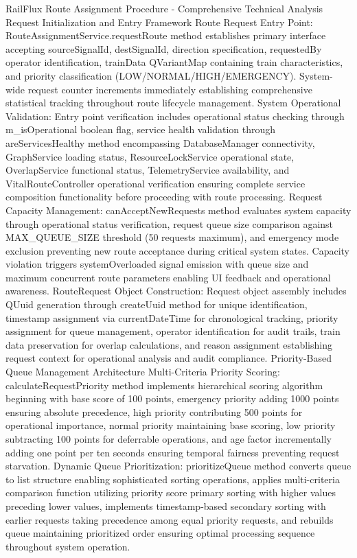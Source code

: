 RailFlux Route Assignment Procedure - Comprehensive Technical Analysis
Request Initialization and Entry Framework
Route Request Entry Point: RouteAssignmentService.requestRoute method establishes primary interface accepting sourceSignalId, destSignalId, direction specification, requestedBy operator identification, trainData QVariantMap containing train characteristics, and priority classification (LOW/NORMAL/HIGH/EMERGENCY). System-wide request counter increments immediately establishing comprehensive statistical tracking throughout route lifecycle management.
System Operational Validation: Entry point verification includes operational status checking through m_isOperational boolean flag, service health validation through areServicesHealthy method encompassing DatabaseManager connectivity, GraphService loading status, ResourceLockService operational state, OverlapService functional status, TelemetryService availability, and VitalRouteController operational verification ensuring complete service composition functionality before proceeding with route processing.
Request Capacity Management: canAcceptNewRequests method evaluates system capacity through operational status verification, request queue size comparison against MAX_QUEUE_SIZE threshold (50 requests maximum), and emergency mode exclusion preventing new route acceptance during critical system states. Capacity violation triggers systemOverloaded signal emission with queue size and maximum concurrent route parameters enabling UI feedback and operational awareness.
RouteRequest Object Construction: Request object assembly includes QUuid generation through createUuid method for unique identification, timestamp assignment via currentDateTime for chronological tracking, priority assignment for queue management, operator identification for audit trails, train data preservation for overlap calculations, and reason assignment establishing request context for operational analysis and audit compliance.
Priority-Based Queue Management Architecture
Multi-Criteria Priority Scoring: calculateRequestPriority method implements hierarchical scoring algorithm beginning with base score of 100 points, emergency priority adding 1000 points ensuring absolute precedence, high priority contributing 500 points for operational importance, normal priority maintaining base scoring, low priority subtracting 100 points for deferrable operations, and age factor incrementally adding one point per ten seconds ensuring temporal fairness preventing request starvation.
Dynamic Queue Prioritization: prioritizeQueue method converts queue to list structure enabling sophisticated sorting operations, applies multi-criteria comparison function utilizing priority score primary sorting with higher values preceding lower values, implements timestamp-based secondary sorting with earlier requests taking precedence among equal priority requests, and rebuilds queue maintaining prioritized order ensuring optimal processing sequence throughout system operation.
